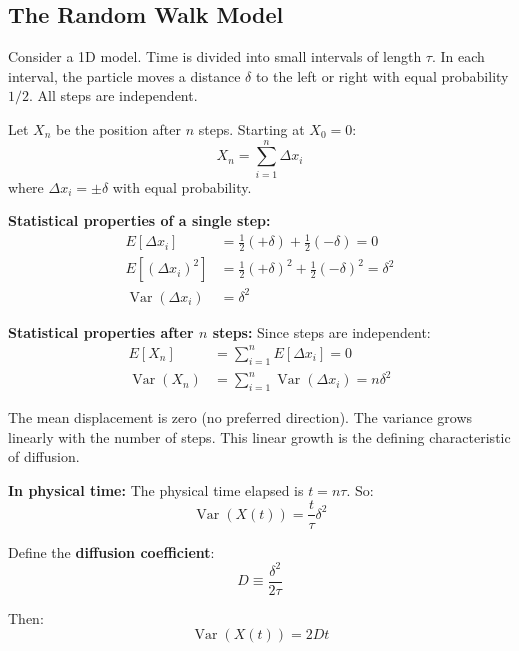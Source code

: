 \documentclass[11pt,a4paper]{article}
\begin{document}
	\subsection{The Random Walk Model}
	
	Consider a 1D model. Time is divided into small intervals of length $\tau$. In each interval, the particle moves a distance $\delta$ to the left or right with equal probability $1/2$. All steps are independent.
	
	Let $X_n$ be the position after $n$ steps. Starting at $X_0 = 0$:
	\begin{equation}
		X_n = \sum_{i=1}^{n} \Delta x_i
	\end{equation}
	where $\Delta x_i = \pm \delta$ with equal probability.
	
	\textbf{Statistical properties of a single step:}
	\begin{align}
		E[\Delta x_i] &= \frac{1}{2}(+\delta) + \frac{1}{2}(-\delta) = 0 \\
		E[(\Delta x_i)^2] &= \frac{1}{2}(+\delta)^2 + \frac{1}{2}(-\delta)^2 = \delta^2 \\
		\operatorname{Var}(\Delta x_i) &= \delta^2
	\end{align}
	
	\textbf{Statistical properties after $n$ steps:}
	Since steps are independent:
	\begin{align}
		E[X_n] &= \sum_{i=1}^{n} E[\Delta x_i] = 0 \\
		\operatorname{Var}(X_n) &= \sum_{i=1}^{n} \operatorname{Var}(\Delta x_i) = n \delta^2
	\end{align}
	
	The mean displacement is zero (no preferred direction). The variance grows linearly with the number of steps. This linear growth is the defining characteristic of diffusion.
	
	\textbf{In physical time:}
	The physical time elapsed is $t = n\tau$. So:
	\begin{equation}
		\operatorname{Var}(X(t)) = \frac{t}{\tau} \delta^2
	\end{equation}
	
	Define the \textbf{diffusion coefficient}:
	\begin{equation}
		D \equiv \frac{\delta^2}{2\tau}
	\end{equation}
	
	Then:
	\begin{equation}
		\operatorname{Var}(X(t)) = 2Dt
	\end{equation}
	
\end{document}
